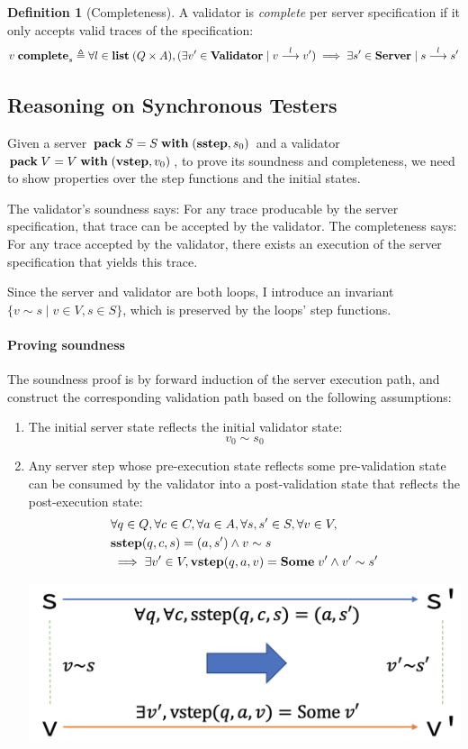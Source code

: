 \documentclass{article}
\theoremstyle{definition}
\newtheorem{definition}{Definition}
\newcommand{\existT}[3]{\ottkw{pack}\;#1=#2\;\ottkw{with}\;#3}
\newcommand{\Server}{\ottkw{Server}}
\newcommand{\Validator}{\ottkw{Validator}}
\newcommand{\sstep}{\ottkw{sstep}}
\newcommand{\vstep}{\ottkw{vstep}}
\newcommand{\Some}[1]{\ottkw{Some}\;#1}
\newcommand{\List}{\ottkw{list}\;}
\newcommand{\yields}[3]{#1\overset{#2}{\longrightarrow}#3}
\newcommand{\accepts}[3]{#1\overset{#2}{\longrightarrow}#3}
\newcommand{\complete}{\ottkw{complete}}
\newcommand{\iscomplete}[2]{#1\;\complete_{#2}}
\newcommand{\Reflects}[2]{#1\sim #2}
\begin{document}
\begin{definition}[Completeness]
  A validator is {\em complete} per server specification if it only accepts valid
  traces of the specification:
  \[ \iscomplete{v}{s}\triangleq\forall l\in \List(Q\times A),(\exists{v'}\in\Validator\mid\accepts{v}{l}{v'})\implies\exists{s'}\in\Server\mid\yields{s}{l}{s'} \]
\end{definition}

\subsection{Reasoning on Synchronous Testers}
\label{sec:sync-reasoning}

Given a server $\existT{S}{S}{(\sstep, s_0)}$ and a validator
$\existT{V}{V}{(\vstep,v_0)}$, to prove its soundness and completeness, we need to
show properties over the step functions and the initial states.

The validator's soundness says: For any trace producable by the server
specification, that trace can be accepted by the validator.  The completeness
says: For any trace accepted by the validator, there exists an execution of the
server specification that yields this trace.

Since the server and validator are both loops, I introduce an invariant
$\{\Reflects{v}{s}\mid v\in V,s\in S\}$, which is preserved by the loops' step
functions.

\paragraph{Proving soundness}
The soundness proof is by forward induction of the server execution path, and
construct the corresponding validation path based on the following assumptions:

\begin{enumerate}
\item The initial server state reflects the initial validator state:
  \[ \Reflects{v_0}{s_0} \]
\item Any server step whose pre-execution state reflects some pre-validation
  state can be consumed by the validator into a post-validation state that
  reflects the post-execution state:
  \begin{align*}
    &\forall q\in Q,\forall c\in C,\forall a\in A,\forall s,s'\in S,\forall v\in V,\\
    &\sstep(q,c,s)=(a,s')\wedge\Reflects{v}{s}\\
    &\implies\exists v'\in V,\vstep(q,a,v)=\Some{v'}\wedge\Reflects{v'}{s'}
  \end{align*}
  \begin{center}
    \includegraphics[width=.5\textwidth]{figures/soundness-preservation}
  \end{center}
\end{enumerate}
\end{document}
